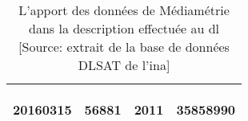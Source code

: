 \begin{table}
\begin{tabularx}{16cm}{|X|X|X|X|}
		 \begin{center}20160315\end{center}&\begin{center}56881\end{center}&\begin{center}2011\end{center}&\begin{center}35858990 \end{center}  \tabularnewline \hline
	\end{tabularx}
\caption[L'apport des données de Médiamétrie dans la description effectuée au \ac{dl}]{L'apport des données de Médiamétrie dans la description effectuée au \ac{dl} [Source: extrait de la base de données DLSAT de l'\ac{ina}]}
\label{sheldon_mediametrie}
\end{table}